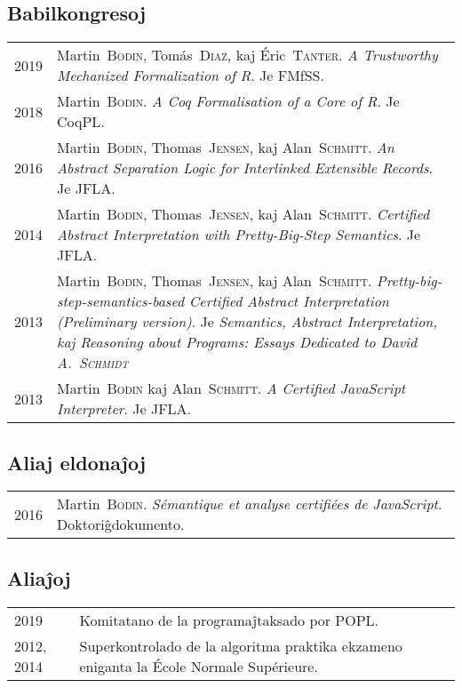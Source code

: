 \documentclass[12pt,a4paper]{article}
\makeatletter
\newcommand{\fr}[1]{\foreignlanguage{french}{{#1}}}
\newcommand{\fr}[1]{\foreignlanguage{french}{{#1}}}
\newenvironment{datecvsection}[1]%
               {\subsection*{#1}%
                 \noindent \begin{tabular}{@{}p{\annee}p{\texte}@{}}}
               {\end{tabular}}
\newcommand\familyName{\textsc}
\newcommand\placeName{}
\makeatother
\begin{document}
\begin{datecvsection}{Babilkongresoj}

  2019 & Martin~\familyName{Bodin}, Tomás~\familyName{Diaz}, kaj Éric~\familyName{Tanter}. \textit{A Trustworthy Mechanized Formalization of R}. Je FMfSS. \\

  2018 & Martin~\familyName{Bodin}. \textit{A Coq Formalisation of a Core of R}. Je CoqPL. \\

  2016 & Martin~\familyName{Bodin}, Thomas~\familyName{Jensen}, kaj Alan~\familyName{Schmitt}. \textit{An Abstract Separation Logic for Interlinked Extensible Records}. Je JFLA. \\

  2014 & Martin~\familyName{Bodin}, Thomas~\familyName{Jensen}, kaj Alan~\familyName{Schmitt}. \textit{Certified Abstract Interpretation with Pretty-Big-Step Semantics}. Je JFLA. \\

  2013 & Martin~\familyName{Bodin}, Thomas~\familyName{Jensen}, kaj Alan~\familyName{Schmitt}. \textit{Pretty-big-step-semantics-based Certified Abstract Interpretation (Preliminary version)}. Je \textit{Semantics, Abstract Interpretation, kaj Reasoning about Programs: Essays Dedicated to David A.~\familyName{Schmidt}} \\ %

  2013 & Martin~\familyName{Bodin} kaj Alan~\familyName{Schmitt}. \textit{A Certified JavaScript Interpreter}. Je JFLA. \\

\end{datecvsection}

\begin{datecvsection}{Aliaj eldonaĵoj}

    2016 & Martin~\familyName{Bodin}. \textit{Sémantique et analyse certifiées de JavaScript}. Doktoriĝdokumento. \\

\end{datecvsection}

\begin{datecvsection}{Aliaĵoj}

    2019 & Komitatano de la programaĵtaksado por POPL. \\

    2012, 2014 & Superkontrolado de la algoritma praktika ekzameno eniganta la \fr{\placeName{École Normale Supérieure}}.

\end{datecvsection}
\end{document}
